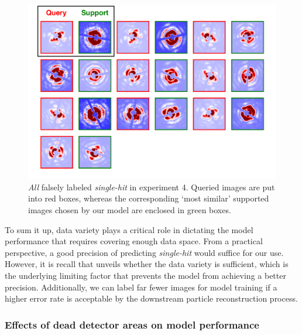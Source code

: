 \begin{figure}
\includegraphics[width=\textwidth,keepaspectratio]
{figures/false_label.single.real.pdf}

\caption{\textit{All} falsely labeled \textit{single-hit} in experiment 4.
Queried images are put into red boxes, whereas the corresponding `most similar'
supported images chosen by our model are enclosed in green boxes.}

\label{fig : false single real}
\end{figure}


To sum it up, data variety plays a critical role in dictating the model
performance that requires covering enough data space.  From a practical
perspective, a good precision of predicting \textit{single-hit} would suffice
for our use.  However, it is recall that unveils whether the data variety is
sufficient, which is the underlying limiting factor that prevents the model from
achieving a better precision.  Additionally, we can label far fewer images for
model training if a higher error rate is acceptable by the downstream particle
reconstruction process.  


\subsubsection{Effects of dead detector areas on model performance}

